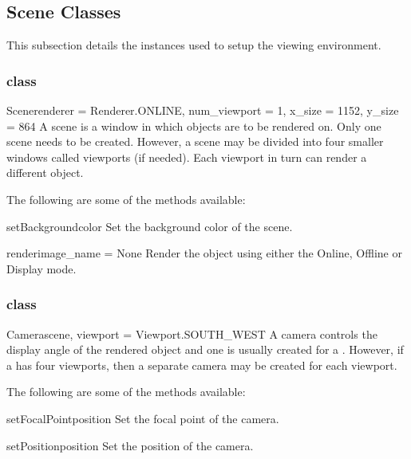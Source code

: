 

\subsection{Scene Classes}
This subsection details the instances used to setup the viewing environment.

\subsubsection{\Scene class}

\begin{classdesc}{Scene}{renderer = Renderer.ONLINE, num_viewport = 1, 
x_size = 1152, y_size = 864}
A scene is a window in which objects are to be rendered on. Only 
one scene needs to be created. However, a scene may be divided into four 
smaller windows called viewports (if needed). Each viewport in turn can 
render a different object. 
\end{classdesc}

The following are some of the methods available:
\begin{methoddesc}[Scene]{setBackground}{color}
Set the background color of the scene.
\end{methoddesc}

\begin{methoddesc}[Scene]{render}{image_name = None}
Render the object using either the Online, Offline or Display mode.
\end{methoddesc}

\subsubsection{\Camera class}

\begin{classdesc}{Camera}{scene, viewport = Viewport.SOUTH_WEST}
A camera controls the display angle of the rendered object and one is 
usually created for a \Scene. However, if a \Scene has four viewports, then a 
separate camera may be created for each viewport. 
\end{classdesc}

The following are some of the methods available:
\begin{methoddesc}[Camera]{setFocalPoint}{position}
Set the focal point of the camera.
\end{methoddesc}

\begin{methoddesc}[Camera]{setPosition}{position}
Set the position of the camera.
\end{methoddesc}


